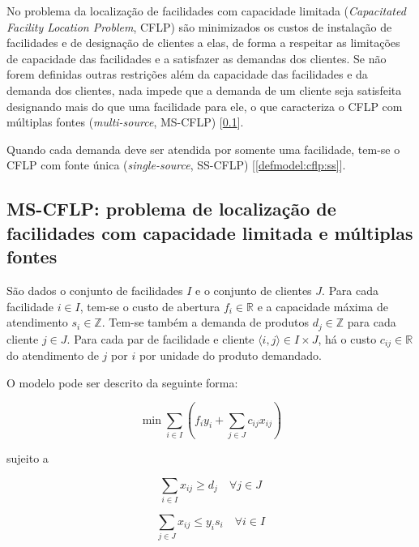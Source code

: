 \documentclass[]{article}
\begin{document}
		No problema da localização de facilidades com capacidade limitada (\textit{Capacitated Facility Location Problem}, CFLP) são minimizados os custos de instalação de facilidades e de designação de clientes a elas, de forma a respeitar as limitações de capacidade das facilidades e a satisfazer as demandas dos clientes.      
		Se não forem definidas outras restrições além da capacidade das facilidades e da demanda dos clientes, nada impede que a demanda de um cliente seja satisfeita designando mais do que uma facilidade para ele, o que caracteriza o CFLP com múltiplas fontes (\textit{multi-source}, MS-CFLP) [\ref{defmodel:cflp:ms}].  
		
		Quando cada demanda deve ser atendida por somente uma facilidade, tem-se o CFLP com fonte única (\textit{single-source}, SS-CFLP) [\ref{defmodel:cflp:ss}]. 
		 
		\subsection{MS-CFLP: problema de localização de facilidades com capacidade limitada e múltiplas fontes} \label{defmodel:cflp:ms}
		
			São dados o conjunto de facilidades $I$ e o conjunto de clientes $J$.
			Para cada facilidade $i \in I$, tem-se o custo de abertura $f_i \in \mathbb{R}$ e a capacidade máxima de atendimento $s_i \in \mathbb{Z}$. 
			Tem-se também a demanda de produtos $d_j \in \mathbb{Z}$ para cada cliente $j \in J$.
			Para cada par de facilidade e cliente $\langle i, j \rangle \in I \times J$, há o custo $c_{ij} \in \mathbb{R}$ do atendimento de $j$ por $i$ por unidade do produto demandado.  
			
			O modelo pode ser descrito da seguinte forma:
		
			\begin{equation}
				\label{cflp:ms:obj}		
				\min \sum_{i \in I} 
				(
				f_i y_i + \sum_{j \in J} c_{ij} x_{ij}
				)
			\end{equation}
		
			sujeito a 				
			
			\begin{equation}
				\label{cflp:ms:const:demand}		
				\sum_{i \in I} x_{ij} \ge d_j %
				\quad
				\forall j \in J
			\end{equation}
		
			\begin{equation}
				\label{cflp:ms:const:capacity}		
				\sum_{j \in J} x_{ij} \le y_i s_i 
				\quad
				\forall i \in I
			\end{equation}
			
\end{document}
